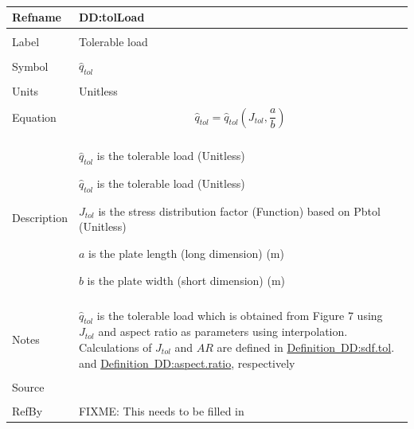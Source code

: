 \documentclass[12pt]{article}
\begin{document}
~\newline
\noindent \begin{minipage}{\textwidth}
\begin{tabular}{p{} p{}}
\toprule \textbf{Refname} & \textbf{DD:tolLoad}
\label{DD:tolLoad}
\\ \midrule \\
Label & Tolerable load
\\ \midrule \\
Symbol & ${\hat{q}_{tol}}$
\\ \midrule \\
Units & Unitless
\\ \midrule \\
Equation & \begin{dmath}
           {\hat{q}_{tol}}={\hat{q}_{tol}}\left({J_{tol}},\frac{a}{b}\right)
           \end{dmath}
\\ \midrule \\
Description & \begin{symbDescription}
              \item{${\hat{q}_{tol}}$ is the tolerable load (Unitless)}
              \item{${\hat{q}_{tol}}$ is the tolerable load (Unitless)}
              \item{${J_{tol}}$ is the stress distribution factor (Function) based on Pbtol (Unitless)}
              \item{$a$ is the plate length (long dimension) (m)}
              \item{$b$ is the plate width (short dimension) (m)}
              \end{symbDescription}
\\ \midrule \\
Notes & ${\hat{q}_{tol}}$ is the tolerable load which is obtained from Figure 7 using ${J_{tol}}$ and aspect ratio as parameters using interpolation. Calculations of ${J_{tol}}$ and $AR$ are defined in \hyperref[DD:sdf.tol]{Definition~DD:sdf.tol}. and \hyperref[DD:aspect.ratio]{Definition~DD:aspect.ratio}, respectively
\\ \midrule \\
Source & 
\\ \midrule \\
RefBy & FIXME: This needs to be filled in
\\ \bottomrule \end{tabular}
\end{minipage}\\
\end{document}

